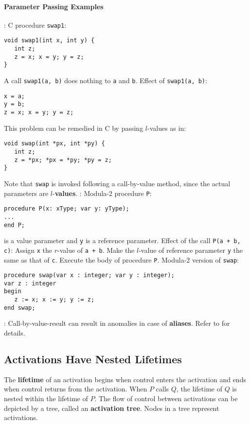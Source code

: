 \documentclass{article}
\begin{document}
\paragraph{Parameter Passing Examples}
\bit
{}:
	\bit
	\w C procedure {\tt{}swap1}:
\begin{verbatim}
void swap1(int x, int y) {
   int z;
   z = x; x = y; y = z;
}
\end{verbatim}
	\w A call {\tt{}swap1(a, b)} does nothing to {\tt{}a} and {\tt{}b}.
	\w Effect of {\tt{}swap1(a, b)}:
\begin{verbatim}
x = a;
y = b;
z = x; x = y; y = z;
\end{verbatim}
	\w This problem can be remedied in C by passing $l$-values as in:
\begin{verbatim}
void swap(int *px, int *py) {
   int z;
   z = *px; *px = *py; *py = z;
}
\end{verbatim}
		\bit
		\w Note that {\tt{}swap} is invoked following 
			a call-by-value method, since the actual
			parameters are $l$-{\bf{}values}.
		\eit
	\eit
{}:
	\bit
	\w Modula-2 procedure {\tt{}P}:
\begin{verbatim}
procedure P(x: xType; var y: yType);
...
end P;
\end{verbatim}
	 is a value parameter and {\tt{}y} is a reference
		parameter.
	\w Effect of the call {\tt{}P(a + b, c)}:
		\ben
		\w Assign {\tt{}x} the $r$-value of {\tt{}a + b}.
		\w Make the $l$-value of reference parameter {\tt{}y}
			the same as that of {\tt{}c}.
		\w Execute the body of procedure {\tt{}P}.
		\een
	\w Modula-2 version of {\tt{}swap}:
\begin{verbatim}
procedure swap(var x : integer; var y : integer);
var z : integer
begin
   z := x; x := y; y := z;
end swap;
\end{verbatim}
	\eit	
{}:
	\bit
	\w Call-by-value-result can result in anomalies in case of
		{\bf{}aliases}. Refer to \cite[page 130]{Sethi89} for details.
	\eit
\eit

\subsection{Activations Have Nested Lifetimes}
\bit
\w The {\bf{}lifetime} of an activation begins when control
	enters the activation and ends when control returns from the 
	activation.
	\bit
	\w When $P$ calls $Q$, the lifetime of $Q$ is nested within 
		the lifetime of $P$.
	\eit
\w The flow of control between activations can be depicted by a tree,
	called an {\bf{}activation tree}.
	\bit
	\w Nodes in a tree represent activations.
	\eit
\eit
\end{document}
